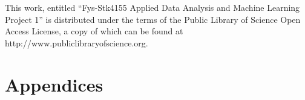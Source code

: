 \documentclass[a4paper,11pt]{book}
\title{\mintittel}
\author{Magnus Bareid}
\date{\today}
\newcommand{\mintittel}{Fys-Stk4155 Applied Data Analysis and Machine Learning\\Project 1}
\begin{document}


\vspace{4mm}

\noindent This work, entitled ``\mintittel'' is distributed under the
terms of the Public Library of Science Open Access License, a copy of which can be found at
http://www.publiclibraryofscience.org. 

\tableofcontents

\listoffigures
\newpage
\thispagestyle{empty}
\mbox{}

\newpage
\pagestyle{fancyplain}









	
\part*{Appendices}
\appendix




%
\end{document}
